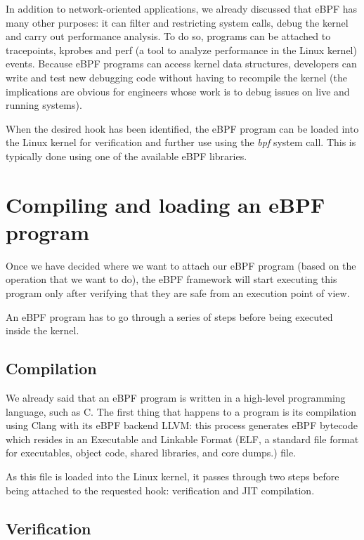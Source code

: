 In addition to network-oriented applications, we already discussed that eBPF has many other purposes: it can filter and restricting system calls, debug the kernel and carry out performance analysis.
To do so, programs can be attached to tracepoints, kprobes and perf (a tool to analyze performance in the Linux kernel) events.
Because eBPF programs can access kernel data structures, developers can write and test new debugging code without having to recompile the kernel (the implications are obvious for engineers whose work is to debug issues on live and running systems).

When the desired hook has been identified, the eBPF program can be loaded into the Linux kernel for verification and further use using the \textit{bpf} system call. 
This is typically done using one of the available eBPF libraries. 

\section{Compiling and loading an eBPF program}

Once we have decided where we want to attach our eBPF program (based on the operation that we want to do), the eBPF framework will start executing this program only after verifying that they are safe from an execution point of view. 

An eBPF program has to go through a series of steps before being executed inside the kernel.

\subsection{Compilation}

We already said that an eBPF program is written in a high-level programming language, such as C.
The first thing that happens to a program is its compilation using Clang with its eBPF backend LLVM: this process generates eBPF bytecode which resides in an Executable and Linkable Format (ELF, a standard file format for executables, object code, shared libraries, and core dumps.) file.

As this file is loaded into the Linux kernel, it passes through two steps before being attached to the requested hook: verification and JIT compilation.

\subsection{Verification}

